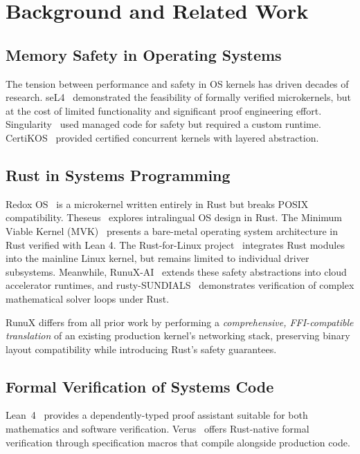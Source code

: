 \documentclass[sigconf,nonacm=false]{acmart}
\begin{document}
\section{Background and Related Work}
\label{sec:related}

\subsection{Memory Safety in Operating Systems}
The tension between performance and safety in OS kernels has driven decades of research. seL4~\cite{seL4_2009} demonstrated the feasibility of formally verified microkernels, but at the cost of limited functionality and significant proof engineering effort. Singularity~\cite{Singularity2007} used managed code for safety but required a custom runtime. CertiKOS~\cite{CertiKOS2016} provided certified concurrent kernels with layered abstraction.

\subsection{Rust in Systems Programming}
Redox OS~\cite{RedoxOS} is a microkernel written entirely in Rust but breaks POSIX compatibility. Theseus~\cite{Theseus2020} explores intralingual OS design in Rust. The Minimum Viable Kernel (MVK)~\cite{CallensMvk2026,CallensSecurity2026} presents a bare-metal operating system architecture in Rust verified with Lean 4. The Rust-for-Linux project~\cite{RustForLinux2022} integrates Rust modules into the mainline Linux kernel, but remains limited to individual driver subsystems. Meanwhile, RunuX-AI~\cite{CallensRunuxAi2027} extends these safety abstractions into cloud accelerator runtimes, and rusty-SUNDIALS~\cite{CallensSundials2026} demonstrates verification of complex mathematical solver loops under Rust.

RunuX differs from all prior work by performing a \emph{comprehensive, FFI-compatible translation} of an existing production kernel's networking stack, preserving binary layout compatibility while introducing Rust's safety guarantees.

\subsection{Formal Verification of Systems Code}
Lean~4~\cite{Lean4_2021} provides a dependently-typed proof assistant suitable for both mathematics and software verification. Verus~\cite{Verus2023} offers Rust-native formal verification through specification macros that compile alongside production code.
\end{document}
